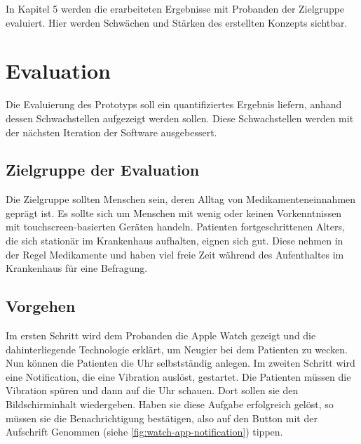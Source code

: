 In Kapitel 5 werden die erarbeiteten Ergebnisse mit Probanden der Zielgruppe evaluiert. Hier werden Schwächen und Stärken des erstellten Konzepts sichtbar.

\section{Evaluation}
Die Evaluierung des Prototyps soll ein quantifiziertes Ergebnis liefern, anhand dessen Schwachstellen aufgezeigt werden sollen. Diese Schwachstellen werden mit der nächsten Iteration der Software ausgebessert.

\subsection{Zielgruppe der Evaluation}
Die Zielgruppe sollten Menschen sein, deren Alltag von Medikamenteneinnahmen geprägt ist. Es sollte sich um Menschen mit wenig oder keinen Vorkenntnissen mit touchscreen-basierten Geräten handeln.  Patienten fortgeschrittenen Alters, die sich stationär im Krankenhaus aufhalten, eignen sich gut. Diese nehmen in der Regel Medikamente und haben viel freie Zeit während des Aufenthaltes im Krankenhaus für eine Befragung.

\subsection{Vorgehen}
\label{ch:vorgehen}
Im ersten Schritt wird dem Probanden die Apple Watch gezeigt und die dahinterliegende Technologie erklärt, um Neugier bei dem Patienten zu wecken. Nun können die Patienten die Uhr selbstständig anlegen. 
Im zweiten Schritt wird eine Notification, die eine Vibration auslöst, gestartet. Die Patienten müssen die Vibration spüren und dann auf die Uhr schauen. Dort sollen sie den Bildschirminhalt wiedergeben. Haben sie diese Aufgabe erfolgreich gelöst, so müssen sie die Benachrichtigung bestätigen, also auf den Button mit der Aufschrift \glqq Genommen \grqq (siehe \ref{fig:watch-app-notification}) tippen.

